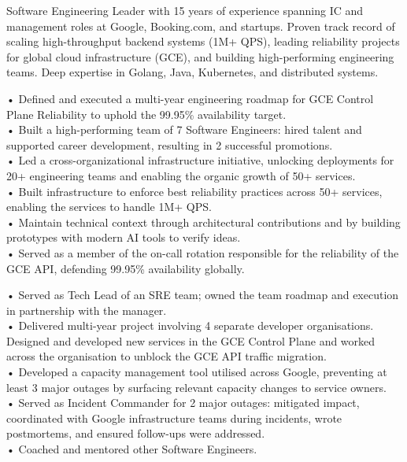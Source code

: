 \documentclass[11pt,a4paper]{moderncv-xetex}
\begin{document}
\setlength{\parskip}{2em}
\maketitle

Software Engineering Leader with 15 years of experience spanning IC and management roles at Google, Booking.com, and startups. Proven track record of scaling high-throughput backend systems (1M+ QPS), leading reliability projects for global cloud infrastructure (GCE), and building high-performing engineering teams. Deep expertise in Golang, Java, Kubernetes, and distributed systems.

{
• Defined and executed a multi-year engineering roadmap for GCE Control Plane Reliability to uphold the 99.95\% availability target.
\\
• Built a high-performing team of 7 Software Engineers: hired talent and supported career development, resulting in 2 successful promotions.
\\
• Led a cross-organizational infrastructure initiative, unlocking deployments for 20+ engineering teams and enabling the organic growth of 50+ services.
\\
• Built infrastructure to enforce best reliability practices across 50+ services, enabling the services to handle 1M+ QPS.
\\
• Maintain technical context through architectural contributions and by building prototypes with modern AI tools to verify ideas.
\\
• Served as a member of the on-call rotation responsible for the reliability of the GCE API, defending 99.95\% availability globally.
}

{
• Served as Tech Lead of an SRE team; owned the team roadmap and execution in partnership with the manager.
\\
• Delivered multi-year project involving 4 separate developer organisations. Designed and developed new services in the GCE Control Plane and worked across the organisation to unblock the GCE API traffic migration.
\\
• Developed a capacity management tool utilised across Google, preventing at least 3 major outages by surfacing relevant capacity changes to service owners.
\\
• Served as Incident Commander for 2 major outages: mitigated impact, coordinated with Google infrastructure teams during incidents, wrote postmortems, and ensured follow-ups were addressed.
\\
• Coached and mentored other Software Engineers.
}
\end{document}
